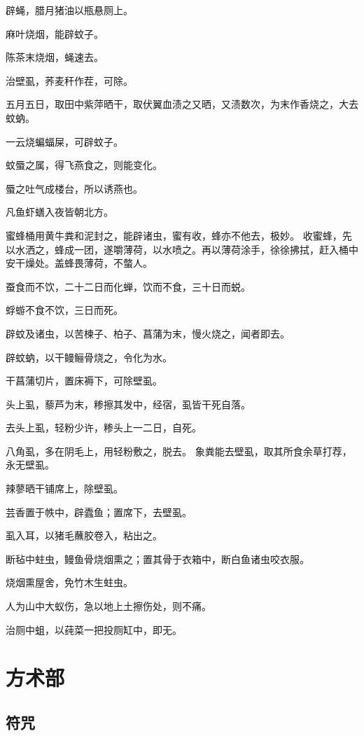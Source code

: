 \documentclass[a4paper,12pt,UTF8,twoside]{ctexbook}
\begin{document}
    辟蝇，腊月猪油以瓶悬厕上。
    
    麻叶烧烟，能辟蚊子。
    
    陈茶末烧烟，蝇速去。
    
    治壁虱，荞麦秆作茬，可除。
    
    五月五日，取田中紫萍晒干，取伏翼血渍之又晒，又渍数次，为末作香烧之，大去蚊蚋。
    
    一云烧蝙蝠屎，可辟蚊子。
    
    蚊蜃之属，得飞燕食之，则能变化。
    
    蜃之吐气成楼台，所以诱燕也。
    
    凡鱼虾蟮入夜皆朝北方。
    
    蜜蜂桶用黄牛粪和泥封之，能辟诸虫，蜜有收，蜂亦不他去，极妙。 收蜜蜂，先以水洒之，蜂成一团，遂嚼薄荷，以水喷之。再以薄荷涂手，徐徐拂拭，赶入桶中安干燥处。盖蜂畏薄荷，不螫人。
    
    蚕食而不饮，二十二日而化蝉，饮而不食，三十日而蜕。
    
    蜉蝣不食不饮，三日而死。
    
    辟蚊及诸虫，以苦楝子、柏子、菖蒲为末，慢火烧之，闻者即去。
    
    辟蚊蚋，以干鳗鲡骨烧之，令化为水。
    
    干菖蒲切片，置床褥下，可除壁虱。
    
    头上虱，藜芦为末，糁擦其发中，经宿，虱皆干死自落。
    
    去头上虱，轻粉少许，糁头上一二日，自死。
    
    八角虱，多在阴毛上，用轻粉敷之，脱去。 象粪能去壁虱，取其所食余草打荐，永无壁虱。
    
    辣蓼晒干铺席上，除壁虱。
    
    芸香置于帙中，辟蠹鱼；置席下，去壁虱。
    
    虱入耳，以猪毛蘸胶卷入，粘出之。
    
    断毡中蛀虫，鳗鱼骨烧烟熏之；置其骨于衣箱中，断白鱼诸虫咬衣服。
    
    烧烟熏屋舍，免竹木生蛀虫。
    
    人为山中大蚁伤，急以地上土擦伤处，则不痛。
    
    治厕中蛆，以莼菜一把投厕缸中，即无。
    
    \part{方术部}
    
    \chapter{符咒}
    
\end{document}
